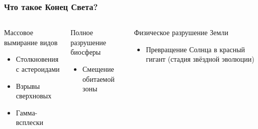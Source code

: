\documentclass[aspectratio=169]{beamer}
\begin{document}
\begin{frame}
\frametitle{Что такое Конец Света?}
\begin{columns}[c]
\begin{block}{Массовое вымирание видов}
      \begin{itemize}
        \item Столкновения с астероидами
        \item Взрывы сверхновых
        \item Гамма-всплески
      \end{itemize}
\end{block}
\begin{block}{Полное разрушение биосферы}
      \begin{itemize}
      \item Смещение обитаемой зоны
      \end{itemize}
\end{block}
\begin{block}{Физическое разрушение Земли}
      \begin{itemize}
      \item Превращение Солнца в красный гигант (стадия звёздной эволюции)
      \end{itemize}
\end{block}
\end{columns}
\end{frame}
\end{document}
